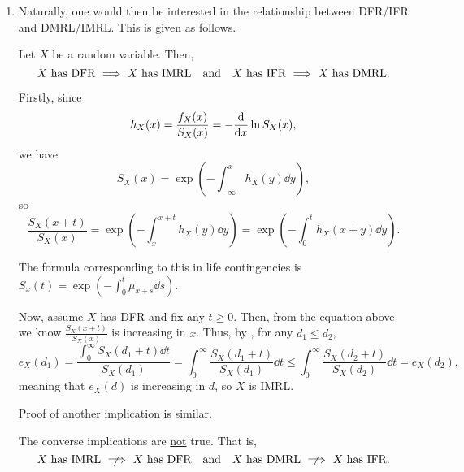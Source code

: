 \begin{enumerate}
\item Naturally, one would then be interested in the relationship between
DFR/IFR and DMRL/IMRL. This is given as follows.
\begin{proposition}
\label{prp:fr-imp-inv-mrl}
Let \(X\) be a random variable. Then,
\[
\text{\(X\) has DFR \(\implies\) \(X\) has IMRL}
\qqtext{and}
\text{\(X\) has IFR \(\implies\) \(X\) has DMRL}.
\]
\end{proposition}
\begin{pf}
Firstly, since
\[
h_X(x)=\frac{f_X(x)}{S_X(x)}=-\dv{}{x}\ln S_X(x),
\]
we have
\[
S_X(x)=\exp(-\int_{-\infty}^{x}h_X(y)\dd{y}),
\]
so
\[
\frac{S_X(x+t)}{S_X(x)}=\exp(-\int_{x}^{x+t}h_X(y)\dd{y})
=\exp(-\int_{0}^{t}h_X(x+y)\dd{y}).
\]
\begin{note}
The formula corresponding to this in life contingencies is
\(\displaystyle S_x(t)=\exp(-\int_{0}^{t}\mu_{x+s}\dd{s})\).
\end{note}

Now, assume \(X\) has DFR and fix any \(t\ge 0\). Then, from the equation above
we know \(\displaystyle \frac{S_X(x+t)}{S_X(x)}\) is increasing in \(x\). Thus,
by , for any \(d_1\le d_2\),
\[
e_X(d_1)=\frac{\displaystyle \int_{0}^{\infty}S_X(d_1+t)\dd{t}}{S_X(d_1)}
=\int_{0}^{\infty}\frac{S_X(d_1+t)}{S_X(d_1)}\dd{t}
\le \int_{0}^{\infty}\frac{S_X(d_2+t)}{S_X(d_2)}\dd{t}
=e_X(d_2),
\]
meaning that \(e_X(d)\) is increasing in \(d\), so \(X\) is IMRL.

Proof of another implication is similar.
\end{pf}

\begin{warning}
The converse implications are \underline{not} true. That is,
\[
\text{\(X\) has IMRL \(\centernot\implies\) \(X\) has DFR}
\qqtext{and}
\text{\(X\) has DMRL \(\centernot\implies\) \(X\) has IFR}.
\]
\end{warning}
\end{enumerate}
